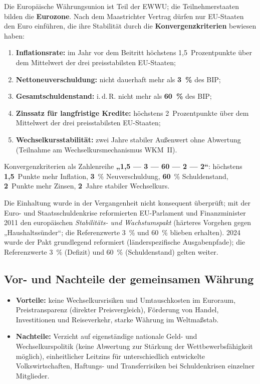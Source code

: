 \documentclass[11pt, a4paper]{article}
\begin{document}
Die Europäische Währungsunion ist Teil der EWWU; die Teilnehmerstaaten bilden die
\textbf{Eurozone}. Nach dem Maastrichter Vertrag dürfen nur EU-Staaten den Euro einführen,
die ihre Stabilität durch die \textbf{Konvergenzkriterien} bewiesen haben:

\begin{enumerate}
  \item \textbf{Inflationsrate:} im Jahr vor dem Beitritt höchstens 1,5~Prozentpunkte über
    dem Mittelwert der drei preisstabilsten EU-Staaten;
  \item \textbf{Nettoneuverschuldung:} nicht dauerhaft mehr als \textbf{3~\%} des BIP;
  \item \textbf{Gesamtschuldenstand:} i.\,d.\,R. nicht mehr als \textbf{60~\%} des BIP;
  \item \textbf{Zinssatz für langfristige Kredite:} höchstens 2~Prozentpunkte über dem
    Mittelwert der drei preisstabilsten EU-Staaten;
  \item \textbf{Wechselkursstabilität:} zwei Jahre stabiler Außenwert ohne Abwertung
    (Teilnahme am Wechselkursmechanismus WKM~II).
\end{enumerate}

\begin{eselsbruecke}
Konvergenzkriterien als Zahlenreihe \textbf{„1,5 --- 3 --- 60 --- 2 --- 2``}: höchstens
\textbf{1,5}~Punkte mehr Inflation, \textbf{3}~\% Neuverschuldung, \textbf{60}~\%
Schuldenstand, \textbf{2}~Punkte mehr Zinsen, \textbf{2}~Jahre stabiler Wechselkurs.
\end{eselsbruecke}

Die Einhaltung wurde in der Vergangenheit nicht konsequent überprüft; mit der Euro- und
Staatsschuldenkrise reformierten EU-Parlament und Finanzminister 2011 den europäischen
\emph{Stabilitäts- und Wachstumspakt} (härteres Vorgehen gegen „Haushaltssünder``; die
Referenzwerte 3~\% und 60~\% blieben erhalten). 2024 wurde der Pakt grundlegend
reformiert (länderspezifische Ausgabenpfade); die Referenzwerte 3~\% (Defizit) und
60~\% (Schuldenstand) gelten weiter.

\subsection{Vor- und Nachteile der gemeinsamen Währung}

\begin{itemize}
  \item \textbf{Vorteile:} keine Wechselkursrisiken und Umtauschkosten im Euroraum,
    Preistransparenz (direkter Preisvergleich), Förderung von Handel, Investitionen und
    Reiseverkehr, starke Währung im Weltmaßstab.
  \item \textbf{Nachteile:} Verzicht auf eigenständige nationale Geld- und
    Wechselkurspolitik (keine Abwertung zur Stärkung der Wettbewerbsfähigkeit möglich),
    einheitlicher Leitzins für unterschiedlich entwickelte Volkswirtschaften,
    Haftungs- und Transferrisiken bei Schuldenkrisen einzelner Mitglieder.
\end{itemize}
\end{document}

